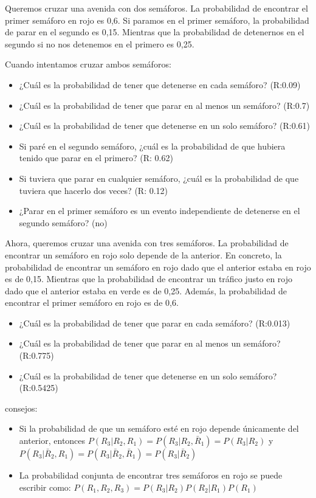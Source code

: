 \documentclass[
]{book}
\providecommand{\tightlist}{%
  \setlength{\itemsep}{0pt}\setlength{\parskip}{0pt}}
\begin{document}
Queremos cruzar una avenida con dos semáforos. La probabilidad de encontrar el primer semáforo en rojo es 0,6. Si paramos en el primer semáforo, la probabilidad de parar en el segundo es 0,15. Mientras que la probabilidad de detenernos en el segundo si no nos detenemos en el primero es 0,25.

Cuando intentamos cruzar ambos semáforos:

\begin{itemize}
\tightlist
\item
  ¿Cuál es la probabilidad de tener que detenerse en cada semáforo? (R:0.09)
\item
  ¿Cuál es la probabilidad de tener que parar en al menos un semáforo? (R:0.7)
\item
  ¿Cuál es la probabilidad de tener que detenerse en un solo semáforo? (R:0.61)
\item
  Si paré en el segundo semáforo, ¿cuál es la probabilidad de que hubiera tenido que parar en el primero? (R: 0.62)
\item
  Si tuviera que parar en cualquier semáforo, ¿cuál es la probabilidad de que tuviera que hacerlo dos veces? (R: 0.12)
\item
  ¿Parar en el primer semáforo es un evento independiente de detenerse en el segundo semáforo? (no)
\end{itemize}

Ahora, queremos cruzar una avenida con tres semáforos. La probabilidad de encontrar un semáforo en rojo solo depende de la anterior. En concreto, la probabilidad de encontrar un semáforo en rojo dado que el anterior estaba en rojo es de 0,15. Mientras que la probabilidad de encontrar un tráfico justo en rojo dado que el anterior estaba en verde es de 0,25. Además, la probabilidad de encontrar el primer semáforo en rojo es de 0,6.

\begin{itemize}
\tightlist
\item
  ¿Cuál es la probabilidad de tener que parar en cada semáforo? (R:0.013)
\item
  ¿Cuál es la probabilidad de tener que parar en al menos un semáforo? (R:0.775)
\item
  ¿Cuál es la probabilidad de tener que detenerse en un solo semáforo? (R:0.5425)
\end{itemize}

consejos:

\begin{itemize}
\item
  Si la probabilidad de que un semáforo esté en rojo depende únicamente del anterior, entonces
  \(P(R_3|R_2,R_1)=P(R_3|R_2,\bar{R}_1)=P(R_3|R_2)\) y \(P(R_3|\bar{R}_2,R_1)=P(R_3 |\bar{R}_2,\bar{R}_1)=P(R_3|\bar{R}_2)\)
\item
  La probabilidad conjunta de encontrar tres semáforos en rojo se puede escribir como:
  \(P(R_1,R_2,R_3)=P(R_3|R_2)P(R_2|R_1)P(R_1)\)
\end{itemize}
\end{document}
